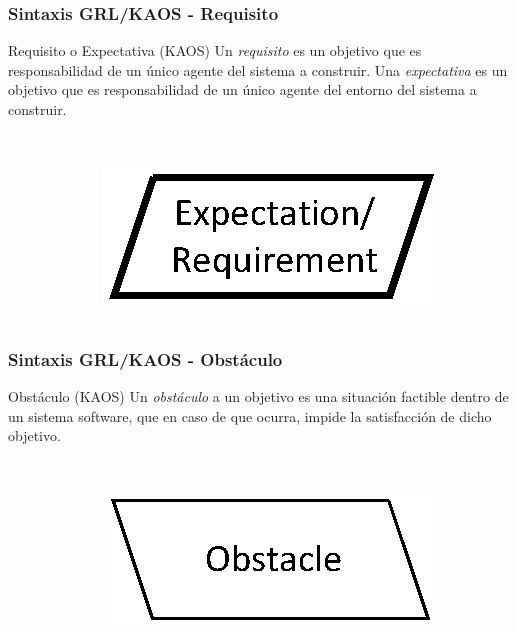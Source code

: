 \documentclass[handout,slidestop,xcolor=pst,dvips,blue]{beamer}
\begin{document}
\begin{frame}[c]
    \frametitle{Sintaxis GRL/KAOS - Requisito}
    \begin{block}{Requisito o Expectativa (KAOS)}
        Un \alert{\emph{requisito}} es un objetivo que es responsabilidad de un único agente del sistema a construir. Una \alert{\emph{expectativa}} es un objetivo que es responsabilidad de un único agente del entorno del sistema a construir.
        \ \\
        \ \\
        \begin{columns}[c]
            \begin{column}{0.50\linewidth}
            \end{column}
            \begin{column}{0.50\linewidth}
                \centering \includegraphics[width=0.50\columnwidth,keepaspectratio=true]{images/objetivos/expectation(KAOS).eps}
            \end{column}
        \end{columns}
     \end{block}
\end{frame}

\begin{frame}[c]
    \frametitle{Sintaxis GRL/KAOS - Obstáculo}
    \begin{block}{Obstáculo (KAOS)}
        Un \alert{\emph{obstáculo}}  a un objetivo es una situación factible dentro de un sistema software, que en caso de que ocurra, impide la satisfacción de dicho objetivo.
        \ \\
        \ \\
        \begin{columns}[c]
            \begin{column}{0.50\linewidth}
            \end{column}
            \begin{column}{0.50\linewidth}
                \centering \includegraphics[width=0.50\columnwidth,keepaspectratio=true]{images/objetivos/obstacle(KAOS).eps}
            \end{column}
        \end{columns}
     \end{block}
\end{frame}
\end{document}
